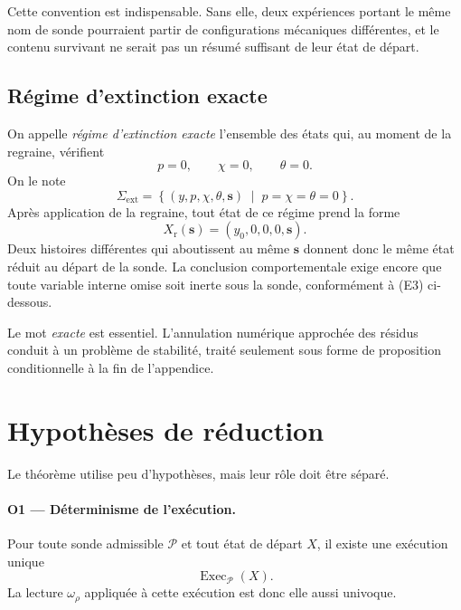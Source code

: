 Cette convention est indispensable. Sans elle, deux expériences
portant le même nom de sonde pourraient partir de configurations
mécaniques différentes, et le contenu survivant ne serait pas un résumé
suffisant de leur état de départ.

\subsection{Régime d'extinction exacte}
\label{annexe-H-extinction}

On appelle \emph{régime d'extinction exacte} l'ensemble des états qui,
au moment de la regraine, vérifient
\begin{equation}
\label{eq:annexe-H-extinction}
 p=0,
 \qquad
 \chi=0,
 \qquad
 \theta=0.
\end{equation}
On le note
\[
\Sigma_{\mathrm{ext}}
=
\left\{
(y,p,\chi,\theta,\mathbf s)
\;\middle|\;
 p=\chi=\theta=0
\right\}.
\]
Après application de la regraine, tout état de ce régime prend la forme
\begin{equation}
\label{eq:annexe-H-etat-reduit}
X_{\mathrm r}(\mathbf s)
=
(y_0,0,0,0,\mathbf s).
\end{equation}
Deux histoires différentes qui aboutissent au même $\mathbf s$ donnent
donc le même état réduit au départ de la sonde. La conclusion
comportementale exige encore que toute variable interne omise soit
inerte sous la sonde, conformément à (E3) ci-dessous.

Le mot \emph{exacte} est essentiel. L'annulation numérique approchée des
résidus conduit à un problème de stabilité, traité seulement sous forme
de proposition conditionnelle à la fin de l'appendice.

\section{Hypothèses de réduction}
\label{annexe-H-hypotheses}

Le théorème utilise peu d'hypothèses, mais leur rôle doit être séparé.

\paragraph{O1 --- Déterminisme de l'exécution.}
Pour toute sonde admissible $\mathcal P$ et tout état de départ $X$, il
existe une exécution unique
\[
\operatorname{Exec}_{\mathcal P}(X).
\]
La lecture $\omega_\rho$ appliquée à cette exécution est donc elle aussi
univoque.

